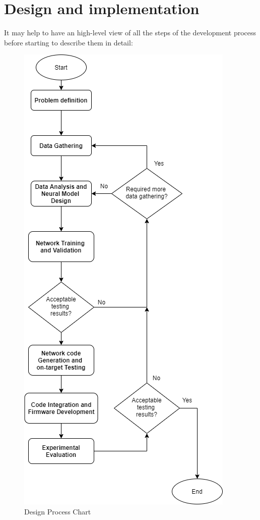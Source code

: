 \section{Design and implementation}
It may help to have an high-level view of all the steps of the development process before starting to describe them in detail:\\
\begin{figure}
	\begin{center}
		\includegraphics[scale=0.6]{figures/dev_flow.png}
		\caption{Design Process Chart}
	\end{center}
\centering
\vspace{-90pt}
\end{figure}
